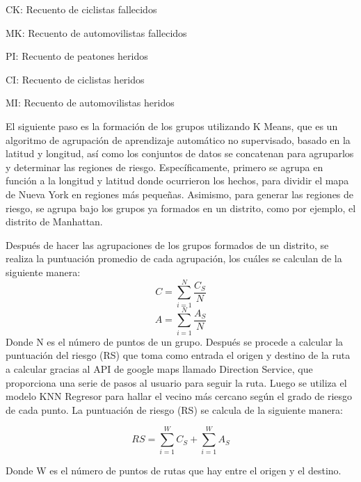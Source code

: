 CK: Recuento de ciclistas fallecidos

MK: Recuento de automovilistas fallecidos

PI: Recuento de peatones heridos

CI: Recuento de ciclistas heridos

MI: Recuento de automovilistas heridos

El siguiente paso es la formación de los grupos utilizando K Means, que es un algoritmo de agrupación de aprendizaje automático no supervisado, basado en la latitud y longitud, así como los conjuntos de datos se concatenan para agruparlos y determinar las regiones de riesgo. Específicamente, primero se agrupa en función a la longitud y latitud donde ocurrieron los hechos, para dividir el mapa de Nueva York en regiones más pequeñas. Asimismo, para generar las regiones de riesgo, se agrupa bajo los grupos ya formados en un distrito, como por ejemplo, el distrito de Manhattan. 

Después de hacer las agrupaciones de los grupos formados de un distrito, se realiza la puntuación promedio de cada agrupación, los cuáles se calculan de la siguiente manera:
\begin{equation} 
	C = \sum_{i = 1}^{N}\frac{C_{S}}{N}
\end{equation}
\begin{equation} 
	A = \sum_{i = 1}^{N}\frac{A_{S}}{N}
\end{equation}
Donde N es el número de puntos de un grupo. Después se procede a calcular la puntuación del riesgo (RS) que toma como entrada el origen y destino de la ruta a calcular gracias al API de google maps llamado Direction Service,  que proporciona una serie de pasos al usuario para seguir la ruta. Luego se utiliza el modelo KNN Regresor para hallar el vecino más cercano según el grado de riesgo de cada punto. La puntuación de riesgo (RS) se calcula de la siguiente manera: 


\begin{equation} 
	RS = \sum_{i=1}^{W}C_{S} + \sum_{i=1}^{W}A_{S}
\end{equation}

Donde W es el número de puntos de rutas que hay entre el origen y el destino.

